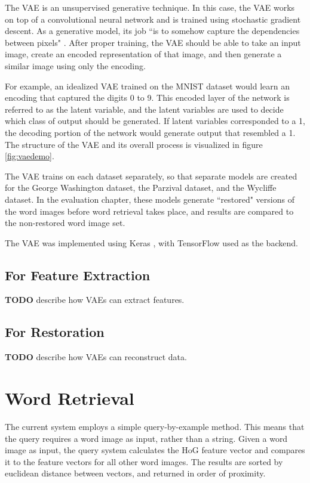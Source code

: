 \documentclass[final]{ukthesis}
\begin{document}
The VAE is an unsupervised generative technique. In this case, the VAE works on top of a convolutional neural network and is trained using stochastic gradient descent. As a generative model, its job ``is to somehow capture the dependencies between pixels" \cite{doersch2016tutorial}. After proper training, the VAE should be able to take an input image, create an encoded representation of that image, and then generate a similar image using only the encoding.

For example, an idealized VAE trained on the MNIST dataset would learn an encoding that captured the digits 0 to 9. This encoded layer of the network is referred to as the latent variable, and the latent variables are used to decide which class of output should be generated. If latent variables corresponded to a 1, the decoding portion of the network would generate output that resembled a 1. The structure of the VAE and its overall process is visualized in figure \ref{fig:vaedemo}.

The VAE trains on each dataset separately, so that separate models are created for the George Washington dataset, the Parzival dataset, and the Wycliffe dataset. In the evaluation chapter, these models generate ``restored" versions of the word images before word retrieval takes place, and results are compared to the non-restored word image set.

The VAE was implemented using Keras \cite{chollet2015keras}, with TensorFlow \cite{abadi2016tensorflow} used as the backend.

\subsection{For Feature Extraction}
\textbf{TODO} describe how VAEs can extract features.


\subsection{For Restoration}
\textbf{TODO} describe how VAEs can reconstruct data.


%
%
\section{Word Retrieval}
The current system employs a simple query-by-example method. This means that the query requires a word image as input, rather than a string. Given a word image as input, the query system calculates the HoG feature vector and compares it to the feature vectors for all other word images. The results are sorted by euclidean distance between vectors, and returned in order of proximity.
\end{document}
